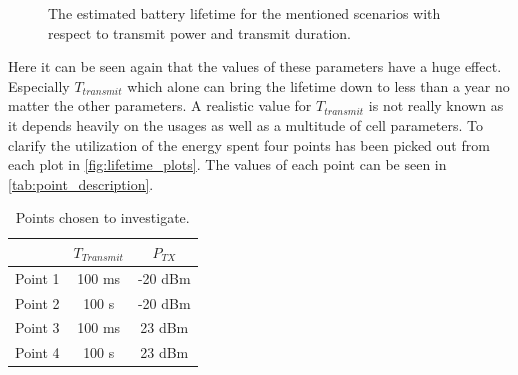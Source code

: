 \begin{figure}[H]
\centering
\begin{minipage}{0.48\textwidth}
\resizebox{\textwidth}{!}{
}
\end{minipage}
\hfill
\begin{minipage}{0.48\textwidth}
\resizebox{\textwidth}{!}{
}
\end{minipage}
\begin{minipage}{0.48\textwidth}
\resizebox{\textwidth}{!}{
}
\end{minipage}
\hfill
\begin{minipage}{0.48\textwidth}
\resizebox{\textwidth}{!}{
}
\end{minipage}
\caption{The estimated battery lifetime for the mentioned scenarios with respect to transmit power and transmit duration.}
\label{fig:lifetime_plots}
\end{figure}

Here it can be seen again that the values of these parameters have a huge effect. Especially $T_{transmit}$ which alone can bring the lifetime down to less than a year no matter the other parameters. A realistic value for $T_{transmit}$ is not really known as it depends heavily on the usages as well as a multitude of cell parameters. To clarify the utilization of the energy spent four points has been picked out from each plot in \autoref{fig:lifetime_plots}. The values of each point can be seen in \autoref{tab:point_description}.

\begin{table}[H]
\centering
\begin{tabular}{|c|c|c|} \hline
& $T_{Transmit}$ & $P_{TX}$ \\ \hline
Point 1 & 100 ms& -20 dBm  	\\ \hline
Point 2 & 100 s	& -20 dBm  	\\ \hline
Point 3 & 100 ms& 23 dBm 	\\ \hline
Point 4 & 100 s	& 23 dBm 	\\ \hline
\end{tabular}
\caption{Points chosen to investigate.}
\label{tab:point_description}
\end{table} 

